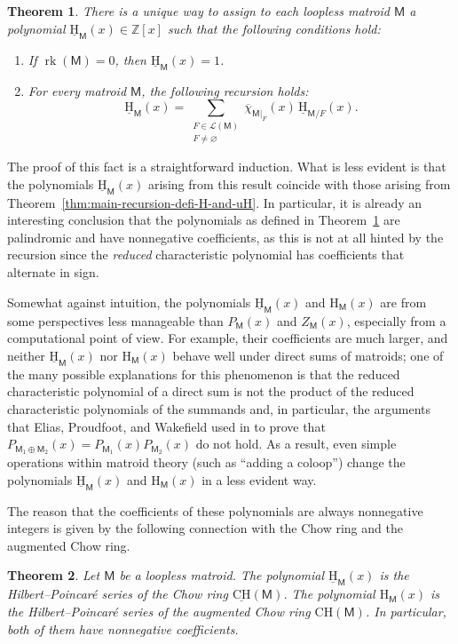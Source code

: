 \documentclass[11pt, a4paper, english]{amsart}
\theoremstyle{teoremas}
\newtheorem{theorem}{Theorem}[section]
\theoremstyle{definition}
\DeclareMathOperator{\rk}{rk}
\newcommand{\M}{\mathsf{M}}
\renewcommand{\H}{\mathrm{H}}
\newcommand{\CH}{\mathrm{CH}}
\newcommand{\uH}{\underline{\mathrm{H}}}
\newcommand{\uCH}{\underline{\mathrm{CH}}}
\begin{document}
\begin{theorem}\label{thm:intro-main0}
    There is a unique way to assign to each loopless matroid $\M$ a polynomial $\uH_{\M}(x)\in \mathbb{Z}[x]$ such that the following conditions hold:
    \begin{enumerate}[\normalfont (i)]
        \item If $\rk(\M) = 0$, then $\uH_{\M}(x) = 1$.
        \item For every matroid $\M$, the following recursion holds:
            \[ \uH_{\M}(x) = \sum_{\substack{F\in\mathcal{L}(\M)\\ F\neq\varnothing}} \overline{\chi}_{\M|_F}(x)\, \uH_{\M/F}(x).\]
    \end{enumerate}
\end{theorem}

The proof of this fact is a straightforward induction. What is less evident is that the polynomials $\uH_{\M}(x)$ arising from this result coincide with those arising from Theorem~\ref{thm:main-recursion-defi-H-and-uH}. In particular, it is already an interesting conclusion that the polynomials as defined in Theorem~\ref{thm:intro-main0} are palindromic and have nonnegative coefficients, as this is not at all hinted by the recursion since the \emph{reduced} characteristic polynomial has coefficients that alternate in sign.

Somewhat against intuition, the polynomials $\uH_{\M}(x)$ and $\H_{\M}(x)$ are from some perspectives less manageable than $P_{\M}(x)$ and $Z_{\M}(x)$, especially from a computational point of view. For example, their coefficients are much larger, and neither $\uH_{\M}(x)$ nor $\H_{\M}(x)$ behave well under direct sums of matroids; one of the many possible explanations for this phenomenon is that the reduced characteristic polynomial of a direct sum is not the product of the reduced characteristic polynomials of the summands and, in particular, the arguments that Elias, Proudfoot, and Wakefield used in \cite[Proposition~2.7]{elias-proudfoot-wakefield} to prove that $P_{\M_1\oplus \M_2}(x) = P_{\M_1}(x)P_{\M_2}(x)$ do not hold. As a result, even simple operations within matroid theory (such as ``adding a coloop'') change the polynomials $\uH_{\M}(x)$ and $\H_{\M}(x)$ in a less evident way.

The reason that the coefficients of these polynomials are always nonnegative integers is given by the following connection with the Chow ring and the augmented Chow ring.

\begin{theorem}\label{thm:correcthpseries}
    Let $\M$ be a loopless matroid. The polynomial $\uH_{\M}(x)$ is the Hilbert--Poincar\'e series of the Chow ring $\uCH(\M)$. The polynomial $\H_{\M}(x)$ is the Hilbert--Poincar\'e series of the augmented Chow ring $\CH(\M)$. In particular, both of them have nonnegative coefficients. 
\end{theorem}
\end{document}
